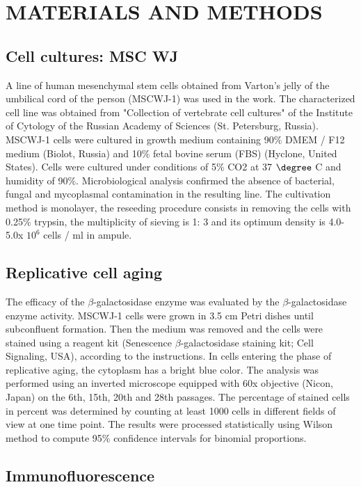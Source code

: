 \documentclass[english,authoryear]{elsarticle}
\begin{document}
\section{MATERIALS AND METHODS}

\subsection{Cell cultures: MSC WJ}

A line of human mesenchymal stem cells obtained from Varton's jelly of the umbilical cord of the person (MSCWJ-1) was used in the work.
The characterized cell line was obtained from "Collection of vertebrate cell cultures" of the Institute of Cytology of the Russian Academy of Sciences (St. Petersburg, Russia).
MSCWJ-1 cells were cultured in growth medium containing 90\% DMEM / F12 medium (Biolot, Russia) and 10\% fetal bovine serum (FBS) (Hyclone, United States). Cells were cultured under conditions of 5\% CO2 at 37 $\degree$ C and humidity of 90\%. Microbiological analysis confirmed the absence of bacterial, fungal and mycoplasmal contamination in the resulting line.
The cultivation method is monolayer, the reseeding procedure consists in removing the cells with 0.25\% trypsin, the multiplicity of sieving is 1: 3 and its optimum density is 4.0-5.0x $10 ^ 6$ cells / ml in ampule.

\subsection{Replicative cell aging}

The efficacy of the $\beta$-galactosidase enzyme was evaluated by the $\beta$-galactosidase enzyme activity.
MSCWJ-1 cells were grown in 3.5 cm Petri dishes until subconfluent formation.
Then the medium was removed and the cells were stained using a reagent kit (Senescence $\beta$-galactosidase staining kit; Cell Signaling, USA), according to the instructions.
In cells entering the phase of replicative aging, the cytoplasm has a bright blue color.
The analysis was performed using an inverted microscope equipped with 60x objective (Nicon, Japan) on the 6th, 15th, 20th and 28th passages.
The percentage of stained cells in percent was determined by counting at least 1000 cells in different fields of view at one time point.
The results were processed statistically using Wilson method to compute 95\% confidence intervals for binomial proportions.

\subsection{Immunofluorescence}
\end{document}
